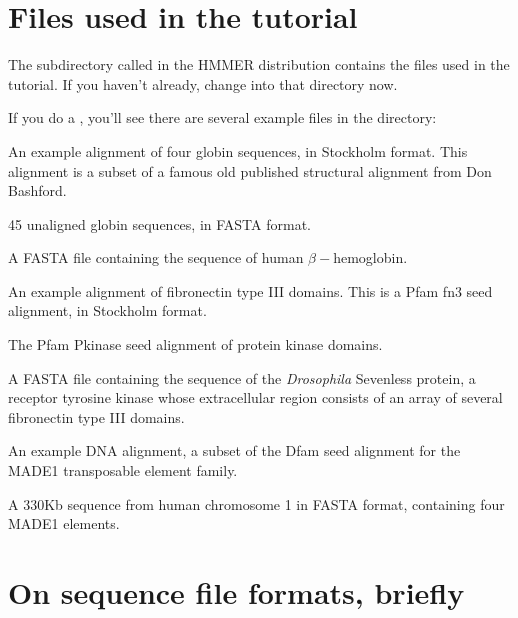 \section{Files used in the tutorial}

The subdirectory called  in the HMMER distribution
contains the files used in the tutorial. If you haven't already,
change into that directory now. 

  \vspace{1ex}
  \vspace{1ex}

If you do a , you'll see there are several example files in
the  directory:

\begin{sreitems}{}
\item[\monob{globins4.sto}] An example alignment of four globin sequences, in
  Stockholm format. This alignment is a subset of a famous old
  published structural alignment from Don Bashford.\cite{Bashford87}
%
\item[\monob{globins45.fa}] 45 unaligned globin sequences, in FASTA
  format.
%
\item[\monob{HBB\_HUMAN}] A FASTA file containing the sequence of
  human $\beta-$hemoglobin.
%
\item[\monob{fn3.sto}] An example alignment of fibronectin type III
  domains. This is a Pfam fn3 seed alignment, in Stockholm format.
%
\item[\monob{Pkinase.sto}] The Pfam Pkinase seed alignment of protein
  kinase domains.
%
\item[\monob{7LESS\_DROME}] A FASTA file containing the sequence of
  the \emph{Drosophila} Sevenless protein, a receptor tyrosine kinase
  whose extracellular region consists of an array of several
  fibronectin type III domains.
%
\item[\monob{MADE1.sto}] An example DNA alignment, a subset
of the Dfam seed alignment for the MADE1 transposable element family. 
%
\item[\monob{dna\_target.fa}] A 330Kb sequence from human chromosome
  1 in FASTA format, containing four MADE1 elements.
\end{sreitems}


\section{On sequence file formats, briefly}

